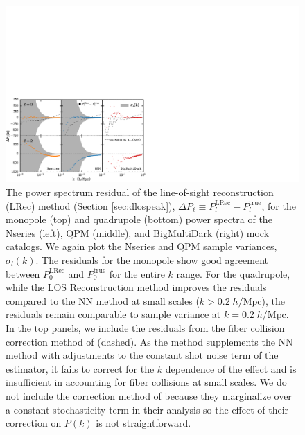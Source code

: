 \begin{figure}
\begin{center}
\includegraphics[width=1.\textwidth]{figs/fc/mock_catalog_dlospeak_true_Plk_resid_floran_offset250_0_rebin6x.pdf} 
\caption{The power spectrum residual of the line-of-sight reconstruction (LRec) 
method (Section \ref{sec:dlospeak}), 
$\Delta P_\ell \equiv P_l^\mathrm{LRec} -P_l^\mathrm{true}$, 
for the monopole (top) and quadrupole (bottom) power spectra of the 
Nseries (left), QPM (middle), and BigMultiDark (right) mock catalogs. 
We again plot the Nseries and QPM sample variances, $\sigma_l(k)$.
The residuals for the monopole show good agreement between 
$P_0^\mathrm{LRec}$ and $P_0^\mathrm{true}$ for the entire $k$ range. 
For the quadrupole, while the LOS Reconstruction method improves the residuals 
compared to the NN method at small scales ($k > 0.2\;h/\mathrm{Mpc}$), 
the residuals remain comparable to sample variance at $k=0.2\;h/\mathrm{Mpc}$.
In the top panels, we include the residuals from the fiber collision 
correction method of \cite{Gil-Marin:2014aa} (dashed). 
As the \cite{Gil-Marin:2014aa} method supplements 
the NN method with adjustments to the constant shot noise term of the estimator, 
it fails to correct for the $k$ dependence of the effect and is insufficient 
in accounting for fiber collisions at small scales. 
We do not include the correction method of \cite{Beutler:2014aa} because they 
marginalize over a constant stochasticity term in their analysis so the effect 
of their correction on $P(k)$ is not straightforward.}
\label{fig:peaksn}
\end{center}
\end{figure}

